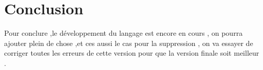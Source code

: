 \chapter{Conclusion}


Pour conclure ,le développement du langage est encore en cours , on pourra ajouter plein de chose ,et ces aussi le cas pour la suppression , on va essayer de corriger toutes les erreurs de cette version pour que la version finale soit meilleur .